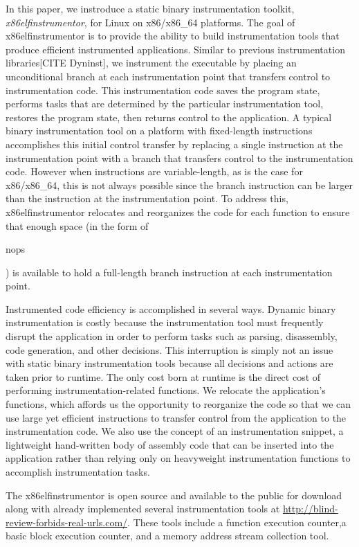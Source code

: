 In this paper, we instroduce a static binary instrumentation toolkit, \textit{x86elfinstrumentor}, for Linux on
x86/x86\_64 platforms. The goal of x86elfinstrumentor is to provide the ability
to build instrumentation tools that produce efficient instrumented
applications. Similar to previous instrumentation libraries[CITE Dyninst], we instrument the executable 
by placing an unconditional branch at each instrumentation
point that transfers control to instrumentation code. This instrumentation code saves the
program state, performs tasks that are determined by the particular instrumentation tool,
restores the program state, then returns control to the application.
A typical binary instrumentation tool on a platform with fixed-length instructions 
\cite{tikir2006pmac} accomplishes this initial control transfer by replacing a
single instruction at the instrumentation point with a branch that transfers
control to the instrumentation code. However when instructions are variable-length, as
is the case for x86/x86\_64, this is not always possible since the branch instruction can be larger than the
instruction at the instrumentation point. To address this, x86elfinstrumentor
relocates and reorganizes the code for each function to ensure that enough
space (in the form of \begin{it}nops\end{it}) is available to hold a full-length branch instruction at each
instrumentation point.

Instrumented code efficiency is accomplished in several ways. Dynamic binary instrumentation
is costly because the instrumentation tool must frequently disrupt the application in order
to perform tasks such as parsing, disassembly, code generation, and other decisions. This
interruption is simply not an issue with static binary instrumentation tools because all
decisions and actions are taken prior to runtime. The only cost born at runtime is the direct
cost of performing instrumentation-related functions. We relocate the application's
functions, which affords us the opportunity to reorganize the code so that we
can use large yet efficient instructions to transfer control from the
application to the instrumentation code. We also use the concept of an
instrumentation snippet, a lightweight hand-written body of assembly code that can
be inserted into the application rather than relying only on heavyweight
instrumentation functions to accomplish instrumentation tasks.

The x86elfinstrumentor is open source and available to the public for download along with already implemented several
instrumentation tools at \url{http://blind-review-forbids-real-urls.com/}. These tools include a function execution counter,a basic block
execution counter, and a memory address stream collection tool.

